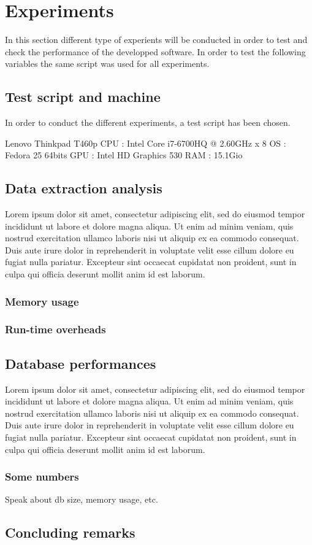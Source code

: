 \chapter{Experiments} %
\label{chap:experiments}

In this section different type of experients will be conducted in order to test and check the performance of the developped software. In order to test the following variables the same script was used for all experiments.

\section{Test script and machine}
In order to conduct the different experiments, a test script has been chosen.

Lenovo Thinkpad T460p
CPU : Intel Core i7-6700HQ @ 2.60GHz x 8
OS : Fedora 25 64bits
GPU : Intel HD Graphics 530
RAM : 15.1Gio

\section{Data extraction analysis}
Lorem ipsum dolor sit amet, consectetur adipiscing elit, sed do eiusmod tempor incididunt ut labore et dolore magna aliqua. Ut enim ad minim veniam, quis nostrud exercitation ullamco laboris nisi ut aliquip ex ea commodo consequat. Duis aute irure dolor in reprehenderit in voluptate velit esse cillum dolore eu fugiat nulla pariatur. Excepteur sint occaecat cupidatat non proident, sunt in culpa qui officia deserunt mollit anim id est laborum.

\subsection{Memory usage}
\subsection{Run-time overheads}

\section{Database performances}
Lorem ipsum dolor sit amet, consectetur adipiscing elit, sed do eiusmod tempor incididunt ut labore et dolore magna aliqua. Ut enim ad minim veniam, quis nostrud exercitation ullamco laboris nisi ut aliquip ex ea commodo consequat. Duis aute irure dolor in reprehenderit in voluptate velit esse cillum dolore eu fugiat nulla pariatur. Excepteur sint occaecat cupidatat non proident, sunt in culpa qui officia deserunt mollit anim id est laborum.
\subsection{Some numbers}
Speak about db size, memory usage, etc.


\section{Concluding remarks}
